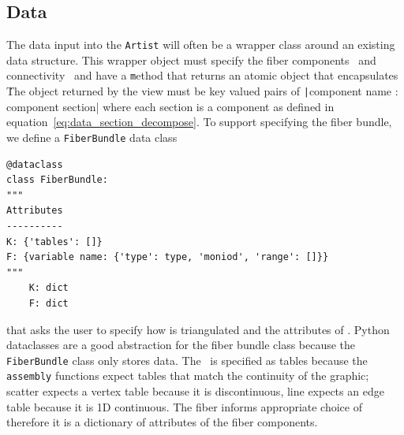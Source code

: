 \documentclass[../main.tex]{subfiles}
\begin{document}
\subsection{Data \dtotal}
\label{sec:code_data}
The data input into the \texttt{Artist} will often be a wrapper class around an existing data structure. This wrapper object must specify the fiber components \dfiber\ and connectivity \dbase\ and have a \texttt method that returns an atomic object that encapsulates \dsection\. The object returned by the view must be key valued pairs of \texttt|{component name : component section}| where each section is a component as defined in equation~\ref{eq:data_section_decompose}. To support specifying the fiber bundle, we define a \texttt{FiberBundle} data class\cite{DataclassesDataClasses}

\begin{verbatim}
@dataclass
class FiberBundle:
"""
Attributes
----------
K: {'tables': []}
F: {variable name: {'type': type, 'moniod', 'range': []}}
"""
    K: dict 
    F: dict
\end{verbatim}

that asks the user to specify how \dbase is triangulated and the attributes of \dfiber. Python dataclasses are a good abstraction for the fiber bundle class because the \texttt{FiberBundle} class only stores data. The \dbase\ is specified as tables because the \texttt{assembly} functions expect tables that match the continuity of the graphic; scatter expects a vertex table because it is discontinuous, line expects an edge table because it is 1D continuous. The fiber informs appropriate choice of \vchannel\, therefore it is a dictionary of attributes of the fiber components. 
\end{document}
